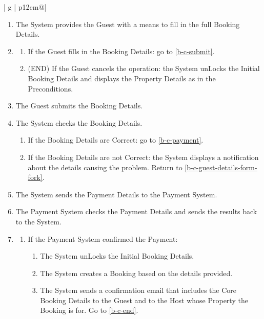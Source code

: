 \begin{table}[H]
\begin{tabular}{| g | p{12cm}@\qquad |}
\begin{enumerate}
\begin{enumerate}
            \end{enumerate}  
            \item \label{b-c-guest-details-form-fork} The System provides the Guest with a means to fill in the full Booking Details.
            \item
            \begin{enumerate}
                \item If the Guest fills in the Booking Details: go to \ref{b-c-submit}.
                \item \label{b-c-guest-details-form-fork-cancel}(END) If the Guest cancels the operation: the System unLocks the Initial Booking Details and displays the Property Details as in the Preconditions.
            \end{enumerate}            
            \item \label{b-c-submit} The Guest submits the Booking Details.
            \item \label{b-c-check-fork} The System checks the Booking Details.
            \begin{enumerate}
                \item If the Booking Details are Correct: go to \ref{b-c-payment}.
                \item If the Booking Details are not Correct: the System displays a notification about the details causing the problem. Return to \ref{b-c-guest-details-form-fork}.
            \end{enumerate}        
            \item \label{b-c-payment} The System sends the Payment Details to the Payment System.
            \item The Payment System checks the Payment Details and sends the results back to the System.
            \item
                \begin{enumerate}
                    \item If the Payment System confirmed the Payment: 
                    \begin{enumerate}
                        \item The System unLocks the Initial Booking Details.
                        \item The System creates a Booking based on the details provided.
                        \item The System sends a confirmation email that includes the Core Booking Details to the Guest and to the Host whose Property the Booking is for. Go to \ref{b-c-end}.

\end{enumerate}
\end{enumerate}
\end{enumerate}
\end{tabular}
\end{table}
